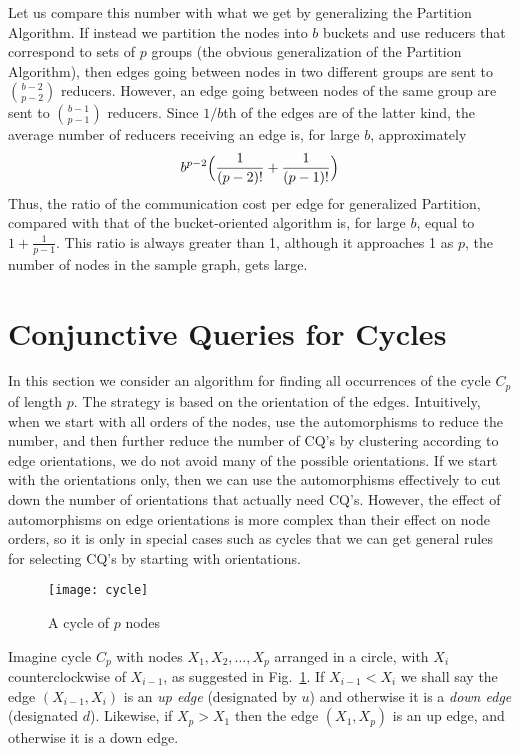 Let us compare this number with what we get by generalizing the Partition Algorithm. If instead we partition the nodes into $b$ buckets and use reducers that correspond to sets of $p$ groups (the obvious generalization of the Partition Algorithm), then edges going between nodes in two different groups are sent to $\binom{b-2}{p-2}$  reducers.  However, an edge going between nodes of the same group are sent to $\binom{b-1}{p-1}$ reducers.  Since $1/b$th of the edges are of the latter kind, the average number of reducers receiving an edge is, for large $b$, approximately
$$b^{p-2}\Bigl(\frac{1}{(p-2)!} + \frac{1}{(p-1)!}\Bigr)$$
Thus, the ratio of the communication cost per edge for generalized Partition, compared with that of the bucket-oriented algorithm is, for large $b$, equal to $1+\frac{1}{p-1}$.
This ratio is always greater than 1, although it approaches 1 as $p$, the number of nodes in the sample graph, gets large.



\section{Conjunctive Queries for Cycles}
\label{cyc-sect}

In this section we consider an algorithm for finding all occurrences of the cycle $C_p$ of length $p$.  The strategy is based on the orientation of the edges.  Intuitively, when we start with all orders of the nodes, use the automorphisms to reduce the number, and then further reduce the number of CQ's by clustering according to edge orientations, we do not avoid many of the possible orientations.  If we start with the orientations only, then we can use the automorphisms effectively to cut down the number of orientations that actually need CQ's.  However, the effect of automorphisms on edge orientations is more complex than their effect on node orders, so it is only in special cases such as cycles that we can get general rules for selecting CQ's by starting with orientations.

\begin{figure}
\centerline{\texttt{[image: cycle]}}
\caption{A cycle of $p$ nodes}
\label{cycle-fig}
\end{figure}

Imagine cycle $C_p$ with nodes $X_1,X_2,\ldots,X_p$ arranged in a circle, with $X_i$ counterclockwise of $X_{i-1}$, as suggested in Fig.~\ref{cycle-fig}.
If $X_{i-1}<X_i$ we shall say the edge $(X_{i-1},X_i)$ is an {\em up edge} (designated by $u$) and otherwise it is a {\em down edge} (designated $d$).  Likewise, if $X_p>X_1$ then the edge $(X_1,X_p)$ is an up edge, and otherwise it is a down edge.

